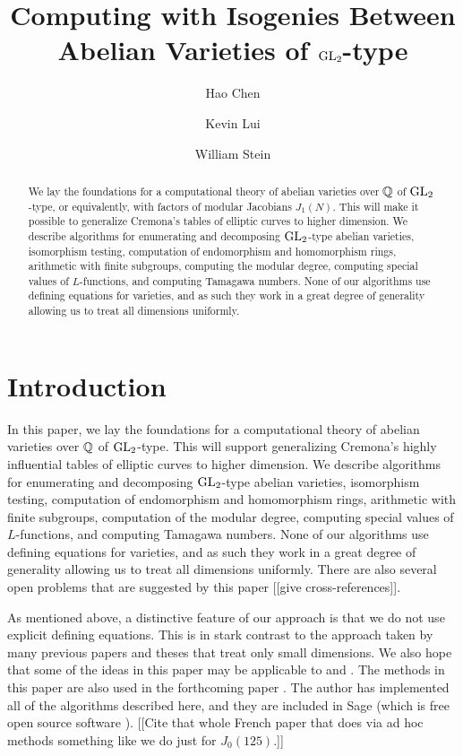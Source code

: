 \documentclass{article}
\title{Computing with Isogenies Between Abelian Varieties of $\operatorname{GL}_2$-type}
\author{Hao Chen \and Kevin Lui \and William Stein}
\begin{document}
\maketitle
\tableofcontents
\begin{abstract}
	We lay the foundations for a computational theory of abelian
	varieties over $\mathbb{Q}$ of $\operatorname{GL}_2$-type, or equivalently, with factors
	of modular Jacobians $J_1(N)$.  This will make it possible to
	generalize Cremona's tables of elliptic curves to higher dimension.
	We describe algorithms for enumerating and decomposing $\operatorname{GL}_2$-type
	abelian varieties, isomorphism testing, computation of endomorphism
	and homomorphism rings, arithmetic with finite subgroups, computing
	the modular degree, computing special values of $L$-functions, and
	computing Tamagawa numbers.  None of our algorithms use defining
	equations for varieties, and as such they work in a great degree of
	generality allowing us to treat all dimensions uniformly.
\end{abstract}


\section{Introduction}
In this paper, we lay the foundations for a computational theory of
abelian varieties over $\mathbb{Q}$ of $\operatorname{GL}_2$-type.  This will support
generalizing Cremona's highly influential tables \cite{cremona:algs}
of elliptic curves to higher dimension.  We describe algorithms for
enumerating and decomposing $\operatorname{GL}_2$-type abelian varieties,
isomorphism testing, computation of endomorphism and homomorphism
rings, arithmetic with finite subgroups, computation of the modular
degree, computing special values of $L$-functions, and computing
Tamagawa numbers.  None of our algorithms use defining equations for
varieties, and as such they work in a great degree of generality
allowing us to treat all dimensions uniformly.  There are also several
open problems that are suggested by this paper [[give
				cross-references]].

As mentioned above, a distinctive feature of our approach is that we
do not use explicit defining equations. This is in stark contrast to the
approach taken by many previous papers and theses \cite{empirical}
that treat only small dimensions.  We also hope that some of the ideas
in this paper may be applicable to \cite{MR2282913} and
\cite{jordiquer}.  The methods in this paper are also used in the
forthcoming paper \cite{calegari-stein:eisenstein}.  The author has
implemented all of the algorithms described here, and they are
included in Sage (which is free open source software \cite{sage}).
	[[Cite that whole French paper that does via ad hoc methods something
				like we do just for $J_0(125)$.]]
\end{document}
